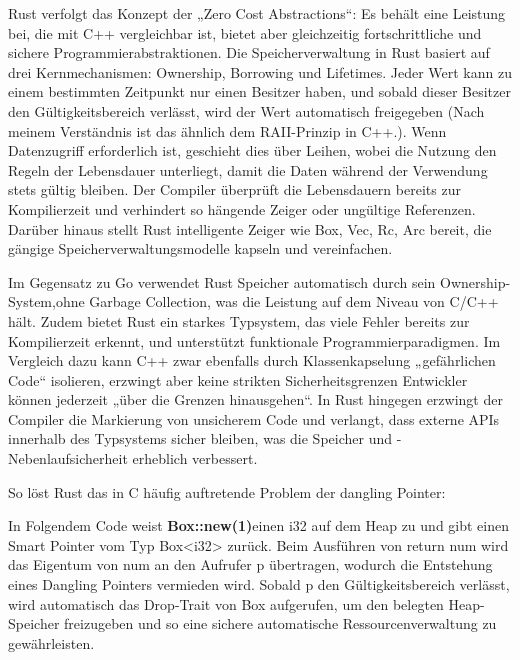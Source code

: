 Rust verfolgt das Konzept der „Zero Cost Abstractions“\autocite{TheRustProgrammingLanguage}: Es behält eine Leistung bei, 
die mit C++ vergleichbar ist, bietet aber gleichzeitig fortschrittliche und sichere 
Programmierabstraktionen. 
Die Speicherverwaltung in Rust basiert auf drei Kernmechanismen: Ownership, Borrowing 
und Lifetimes. Jeder Wert kann zu einem bestimmten Zeitpunkt nur einen Besitzer haben, 
und sobald dieser Besitzer den Gültigkeitsbereich verlässt, wird der Wert automatisch 
freigegeben (Nach meinem Verständnis ist das ähnlich dem RAII-Prinzip in C++.). Wenn Datenzugriff erforderlich ist, 
geschieht dies über Leihen, wobei die Nutzung den Regeln der Lebensdauer unterliegt, damit die Daten 
während der Verwendung stets gültig bleiben. Der Compiler überprüft die Lebensdauern bereits zur 
Kompilierzeit und verhindert so hängende Zeiger oder ungültige Referenzen\autocite{TheRustProgrammingLanguage}. Darüber hinaus stellt Rust 
intelligente Zeiger wie Box, Vec, Rc, Arc bereit, die gängige Speicherverwaltungsmodelle 
kapseln und vereinfachen.

Im Gegensatz zu Go verwendet Rust Speicher automatisch durch sein Ownership-System,ohne Garbage Collection\autocite{TheRustProgrammingLanguage}, was die Leistung auf dem Niveau von C/C++ 
hält. Zudem bietet Rust ein starkes Typsystem, das viele Fehler bereits zur Kompilierzeit erkennt, 
und unterstützt funktionale Programmierparadigmen. Im Vergleich dazu kann C++ zwar ebenfalls durch 
Klassenkapselung „gefährlichen Code“ isolieren, erzwingt aber keine strikten Sicherheitsgrenzen Entwickler 
können jederzeit „über die Grenzen hinausgehen“. In Rust hingegen erzwingt der Compiler 
die Markierung von unsicherem Code und verlangt, dass externe APIs innerhalb des Typsystems sicher bleiben, 
was die Speicher und -Nebenlaufsicherheit erheblich verbessert.

So löst Rust das in C häufig auftretende Problem der \glqq{}dangling Pointer\grqq{}:

\begin{figure}[htp]
    \centering
    
    \label{fig:dangling_pointer_in_Rust}
\end{figure}

In Folgendem Code weist \textbf{Box::new(1)}einen i32 auf dem Heap zu und gibt einen Smart 
Pointer vom Typ Box<i32> zurück. Beim Ausführen von return num wird das Eigentum 
von num an den Aufrufer p übertragen, wodurch die Entstehung eines Dangling Pointers 
vermieden wird. Sobald p den Gültigkeitsbereich verlässt, wird automatisch das 
Drop-Trait von Box aufgerufen, um den belegten Heap-Speicher freizugeben und so 
eine sichere automatische Ressourcenverwaltung zu gewährleisten.

